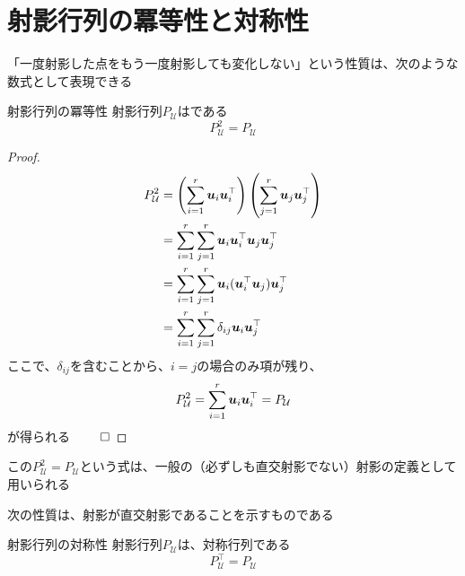 \documentclass[../../../topic_linear-algebra]{subfiles}
\begin{document}
\sectionline
\section{射影行列の冪等性と対称性}

「一度射影した点をもう一度射影しても変化しない」という性質は、次のような数式として表現できる

\begin{theorem*}{射影行列の冪等性}
  射影行列$P_{\mathcal{U}}$はである
  \begin{equation*}
    P_{\mathcal{U}}^2 = P_{\mathcal{U}}
  \end{equation*}
\end{theorem*}

\begin{proof}
  \begin{align*}
    P_{\mathcal{U}}^2 & = \left( \sum_{i=1}^{r} \vb*{u}_i\vb*{u}_i^\top \right) \left( \sum_{j=1}^{r} \vb*{u}_j\vb*{u}_j^\top \right) \\
                      & = \sum_{i=1}^{r} \sum_{j=1}^{r} \vb*{u}_i\vb*{u}_i^\top \vb*{u}_j\vb*{u}_j^\top                               \\
                      & = \sum_{i=1}^{r} \sum_{j=1}^{r} \vb*{u}_i (\vb*{u}_i^\top \vb*{u}_j) \vb*{u}_j^\top                           \\
                      & = \sum_{i=1}^{r} \sum_{j=1}^{r} \delta_{ij}\vb*{u}_i \vb*{u}_j^\top
  \end{align*}
  ここで、$\delta_{ij}$を含むことから、$i = j$の場合のみ項が残り、
  \begin{equation*}
    P_{\mathcal{U}}^2 = \sum_{i=1}^{r} \vb*{u}_i \vb*{u}_i^\top = P_{\mathcal{U}}
  \end{equation*}
  が得られる $\qed$
\end{proof}

\br

この$P_{\mathcal{U}}^2 = P_{\mathcal{U}}$という式は、一般の（必ずしも直交射影でない）射影の定義として用いられる

\br

次の性質は、射影が直交射影であることを示すものである

\begin{theorem*}{射影行列の対称性}
  射影行列$P_{\mathcal{U}}$は、対称行列である
  \begin{equation*}
    P_{\mathcal{U}}^\top = P_{\mathcal{U}}
  \end{equation*}
\end{theorem*}
\end{document}

